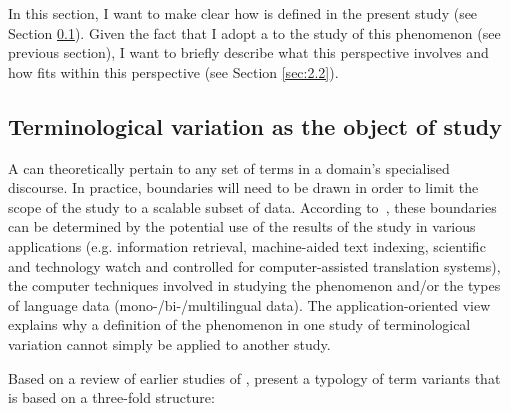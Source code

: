 \documentclass[output=paper]{langsci/langscibook.cls}
\begin{document}
In this section, I want to make clear how  is defined in 
the present study (see Section \ref{sec:2.1}). Given the fact that I adopt a  
to the study of this phenomenon (see previous section), I want to briefly describe 
what this perspective involves and how  fits within this 
perspective (see Section \ref{sec:2.2}).\label{HRef445045508}

\subsection{Terminological variation as the object of study}\label{sec:2.1}

A  can theoretically pertain to any set of terms 
in a domain's specialised discourse. In practice, boundaries will need to be drawn 
in order to limit the scope of the study to a scalable subset of data. According 
to~\citet{Daille2005}, these boundaries can be determined by the potential use of the 
results of the study in various applications (e.g. information retrieval, machine-aided 
text indexing, scientific and technology watch and controlled  for computer-assisted 
translation systems), the computer techniques involved in studying the phenomenon 
and/or the types of language data (mono-/bi-/multilingual data). The application-oriented 
view explains why a definition of the phenomenon in one study of terminological 
variation cannot simply be applied to another study.

Based on a review of earlier studies of , \citet{AguadoDeCeaMontielPonsoda2012} present a typology of term variants that is based on 
a three-fold structure:
\end{document}
